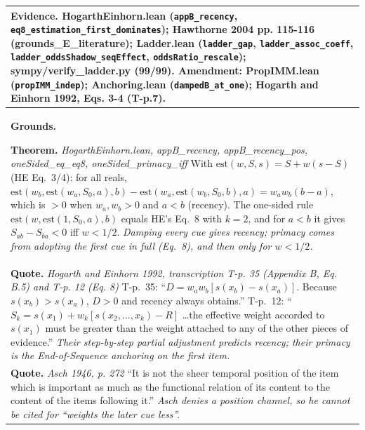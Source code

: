 \documentclass[10pt]{article}
\theoremstyle{definition}
\newlength{\fullw}\setlength{\fullw}{25.9cm}
\begin{document}
{\begin{longtable}{|p{0.9cm}|p{12.2cm}|p{12.2cm}|}
\multicolumn{3}{|p{\fullw}|}{\textbf{Evidence.} HogarthEinhorn.lean (\texttt{appB\_recency}, \texttt{eq8\_estimation\_first\_dominates}); Hawthorne 2004 pp. 115-116 (grounds\_E\_literature); Ladder.lean (\texttt{ladder\_gap}, \texttt{ladder\_assoc\_coeff}, \texttt{ladder\_oddsShadow\_seqEffect}, \texttt{oddsRatio\_rescale}); sympy/verify\_ladder.py (99/99). Amendment: PropIMM.lean (\texttt{propIMM\_indep}); Anchoring.lean (\texttt{dampedB\_at\_one}); Hogarth and Einhorn 1992, Eqs. 3-4 (T-p.7).} \\ \hline
\multicolumn{3}{|p{\fullw}|}{\textbf{Grounds.}\par \textbf{Theorem.} \textit{HogarthEinhorn.lean, appB\_recency, appB\_recency\_pos, oneSided\_eq\_eq8, oneSided\_primacy\_iff} \newline With $\mathrm{est}(w,S,s) = S + w(s-S)$ (HE Eq.~3/4): for all reals,
$\mathrm{est}(w_b,\mathrm{est}(w_a,S_0,a),b) - \mathrm{est}(w_a,\mathrm{est}(w_b,S_0,b),a)
= w_a w_b (b-a)$, which is $>0$ when $w_a,w_b>0$ and $a<b$ (recency). The
one-sided rule $\mathrm{est}(w,\mathrm{est}(1,S_0,a),b)$ equals HE's Eq.~8 with
$k=2$, and for $a<b$ it gives $S_{ab}-S_{ba}<0$ iff $w<1/2$. \newline \textit{Damping every cue gives recency; primacy comes from adopting the
first cue in full (Eq.~8), and then only for $w<1/2$.}} \\
\multicolumn{3}{|p{\fullw}|}{\textbf{Quote.} \textit{Hogarth and Einhorn 1992, transcription T-p. 35 (Appendix B, Eq. B.5) and T-p. 12 (Eq. 8)} \newline T-p.~35: ``$D = w_a w_b[s(x_b) - s(x_a)]$. Because $s(x_b) > s(x_a)$,
$D > 0$ and recency always obtains.'' T-p.~12: ``$S_k = s(x_1) + w_k[s(x_2,\ldots,x_k) - R]$
\ldots the effective weight accorded to $s(x_1)$ must be greater than the weight
attached to any of the other pieces of evidence.'' \newline \textit{Their step-by-step partial adjustment predicts recency; their
primacy is the End-of-Sequence anchoring on the first item.}} \\
\multicolumn{3}{|p{\fullw}|}{\textbf{Quote.} \textit{Asch 1946, p. 272} \newline ``It is not the sheer temporal position of the item which is
important as much as the functional relation of its content to the content of
the items following it.'' \newline \textit{Asch denies a position channel, so he cannot be cited for ``weights
the later cue less''.}} \\

\end{longtable}}
\end{document}
